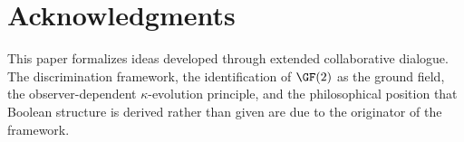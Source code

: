 \section*{Acknowledgments}

This paper formalizes ideas developed through extended collaborative
dialogue. The discrimination framework, the identification of
$\GF(2)$ as the ground field, the observer-dependent $\kappa$-evolution
principle, and the philosophical position that Boolean structure
is derived rather than given are due to the originator of the
framework.

